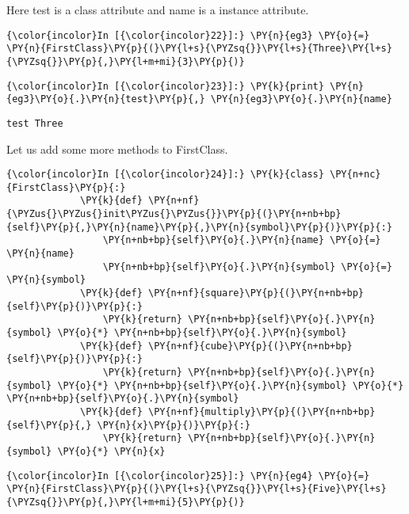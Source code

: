    Here test is a class attribute and name is a instance attribute.

    \begin{Verbatim}[commandchars=\\\{\}]
{\color{incolor}In [{\color{incolor}22}]:} \PY{n}{eg3} \PY{o}{=} \PY{n}{FirstClass}\PY{p}{(}\PY{l+s}{\PYZsq{}}\PY{l+s}{Three}\PY{l+s}{\PYZsq{}}\PY{p}{,}\PY{l+m+mi}{3}\PY{p}{)}
\end{Verbatim}

    \begin{Verbatim}[commandchars=\\\{\}]
{\color{incolor}In [{\color{incolor}23}]:} \PY{k}{print} \PY{n}{eg3}\PY{o}{.}\PY{n}{test}\PY{p}{,} \PY{n}{eg3}\PY{o}{.}\PY{n}{name}
\end{Verbatim}

    \begin{Verbatim}[commandchars=\\\{\}]
test Three
    \end{Verbatim}

    Let us add some more methods to FirstClass.

    \begin{Verbatim}[commandchars=\\\{\}]
{\color{incolor}In [{\color{incolor}24}]:} \PY{k}{class} \PY{n+nc}{FirstClass}\PY{p}{:}
             \PY{k}{def} \PY{n+nf}{\PYZus{}\PYZus{}init\PYZus{}\PYZus{}}\PY{p}{(}\PY{n+nb+bp}{self}\PY{p}{,}\PY{n}{name}\PY{p}{,}\PY{n}{symbol}\PY{p}{)}\PY{p}{:}
                 \PY{n+nb+bp}{self}\PY{o}{.}\PY{n}{name} \PY{o}{=} \PY{n}{name}
                 \PY{n+nb+bp}{self}\PY{o}{.}\PY{n}{symbol} \PY{o}{=} \PY{n}{symbol}
             \PY{k}{def} \PY{n+nf}{square}\PY{p}{(}\PY{n+nb+bp}{self}\PY{p}{)}\PY{p}{:}
                 \PY{k}{return} \PY{n+nb+bp}{self}\PY{o}{.}\PY{n}{symbol} \PY{o}{*} \PY{n+nb+bp}{self}\PY{o}{.}\PY{n}{symbol}
             \PY{k}{def} \PY{n+nf}{cube}\PY{p}{(}\PY{n+nb+bp}{self}\PY{p}{)}\PY{p}{:}
                 \PY{k}{return} \PY{n+nb+bp}{self}\PY{o}{.}\PY{n}{symbol} \PY{o}{*} \PY{n+nb+bp}{self}\PY{o}{.}\PY{n}{symbol} \PY{o}{*} \PY{n+nb+bp}{self}\PY{o}{.}\PY{n}{symbol}
             \PY{k}{def} \PY{n+nf}{multiply}\PY{p}{(}\PY{n+nb+bp}{self}\PY{p}{,} \PY{n}{x}\PY{p}{)}\PY{p}{:}
                 \PY{k}{return} \PY{n+nb+bp}{self}\PY{o}{.}\PY{n}{symbol} \PY{o}{*} \PY{n}{x}
\end{Verbatim}

    \begin{Verbatim}[commandchars=\\\{\}]
{\color{incolor}In [{\color{incolor}25}]:} \PY{n}{eg4} \PY{o}{=} \PY{n}{FirstClass}\PY{p}{(}\PY{l+s}{\PYZsq{}}\PY{l+s}{Five}\PY{l+s}{\PYZsq{}}\PY{p}{,}\PY{l+m+mi}{5}\PY{p}{)}
\end{Verbatim}

